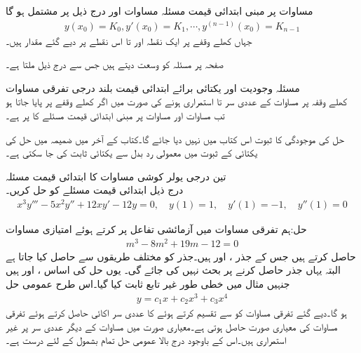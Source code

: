 مساوات  پر مبنی ابتدائی قیمت مسئلہ مساوات  اور درج ذیل   پر مشتمل ہو گا
\begin{align}\label{مساوات_سادہ+بلند_ابتدائی_شرائط}
y(x_0)=K_0, y'(x_0)=K_1,\cdots , y^{(n-1)}(x_0)=K_{n-1}
\end{align}
جہاں  کھلے وقفے  پر ایک نقطہ اور  تا  اس نقطے پر  دیے گئے مقدار ہیں۔

صفحہ  پر مسئلہ  کو وسعت دیتے ہیں جس سے درج ذیل ملتا ہے۔

\quad مسئلہ وجودیت اور یکتائی برائے ابتدائی قیمت بلند درجی  تفرقی مساوات\\
کھلے وقفہ  پر مساوات  کے عددی سر  تا  استمراری ہونے کی صورت میں اگر  کھلے وقفے پر پایا جاتا ہو تب مساوات  اور مساوات  پر مبنی ابتدائی قیمت مسئلے کا  پر     ہے۔

حل کی موجودگی کا ثبوت اس کتاب میں نہیں دیا جائے گا۔کتاب کے آخر میں ضمیمہ  میں  حل کی یکتائی کے ثبوت میں معمولی رد بدل سے یکتائی ثابت کی جا سکتی ہے۔  

\quad تین درجی یولر کوشی مساوات کا ابتدائی قیمت مسئلہ\\
درج ذیل ابتدائی قیمت مسئلے کو حل کریں۔
\begin{align*}
x^3y'''-5x^2y''+12xy'-12y=0,\quad y(1)=1, \quad y'(1)=-1, \quad y''(1)=0
\end{align*}

حل:ہم تفرقی مساوات میں آزمائشی تفاعل  پر کرتے ہوئے امتیازی مساوات
\begin{align*}
m^3-8m^2+19m-12=0
\end{align*}
حاصل کرتے ہیں جس کے جذر ،  اور  ہیں۔جذر  کو مختلف طریقوں سے حاصل کیا جاتا ہے البتہ یہاں جذر حاصل کرنے پر بحث نہیں کی جائے گی۔ یوں حل کی اساس ،  اور  ہیں جنہیں مثال  میں خطی طور غیر تابع ثابت کیا گیا۔اس طرح عمومی حل
\begin{align*}
y=c_1x+c_2x^3+c_3x^4
\end{align*}
ہو گا۔دیے گئے تفرقی مساوات کو   سے تقسیم کرتے ہوئے  کا عددی سر اکائی حاصل کرتے ہوئے تفرقی مساوات کی معیاری صورت حاصل ہوتی ہے۔معیاری صورت میں مساوات کے دیگر عددی سر  پر غیر استمراری ہیں۔اس کے باوجود درج بالا عمومی حل تمام  بشمول   کے لئے درست ہے۔ 

